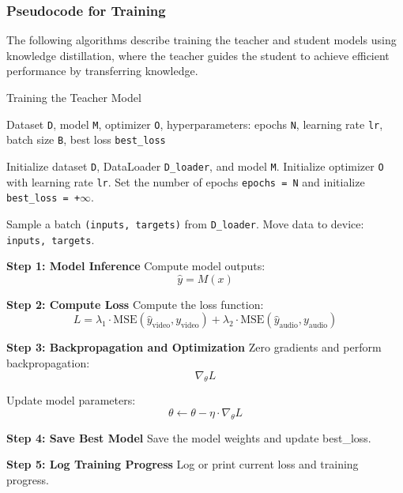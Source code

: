 \pagebreak 

\subsubsection{Pseudocode for Training}
The following algorithms describe training the teacher and student models using knowledge distillation, where the teacher guides the student to achieve efficient performance by transferring knowledge.

\begin{algorithm}
    \caption{Training the Teacher Model}
    \label{alg:teacher-train-loop}
    \begin{algorithmic}[1]
        \REQUIRE Dataset \texttt{D}, model \texttt{M}, optimizer \texttt{O}, hyperparameters: epochs \texttt{N}, learning rate \texttt{lr}, batch size \texttt{B}, best loss \texttt{best\_loss}
    
        \STATE Initialize dataset \texttt{D}, DataLoader \texttt{D\_loader}, and model \texttt{M}.
        \STATE Initialize optimizer \texttt{O} with learning rate \texttt{lr}.
        \STATE Set the number of epochs \texttt{epochs = N} and initialize \texttt{best\_loss = +$\infty$}.
    
            \STATE Sample a batch \texttt{(inputs, targets)} from \texttt{D\_loader}.
            \STATE Move data to device: \texttt{inputs, targets}.
    
            \STATE \textbf{Step 1: Model Inference}
            \STATE Compute model outputs:
            \[
            \hat{y} = M(x)
            \]
    
            \STATE \textbf{Step 2: Compute Loss}
            \STATE Compute the loss function:
            \[
            L = \lambda_1 \cdot \text{MSE}(\hat{y}_\text{video}, y_\text{video}) + \lambda_2 \cdot \text{MSE}(\hat{y}_\text{audio}, y_\text{audio})
            \]
         
    
            \STATE \textbf{Step 3: Backpropagation and Optimization}
            \STATE Zero gradients and perform backpropagation:
            \[
            \nabla_{\theta} L
            \]

            \STATE Update model parameters:
            \[
            \theta \gets \theta - \eta \cdot \nabla_{\theta} L
            \]
    
            \STATE \textbf{Step 4: Save Best Model}
                \STATE Save the model weights and update best\_loss.
            \ENDIF
    
            \STATE \textbf{Step 5: Log Training Progress}
            \STATE Log or print current loss and training progress.
        \ENDFOR
    \end{algorithmic}
\end{algorithm}

